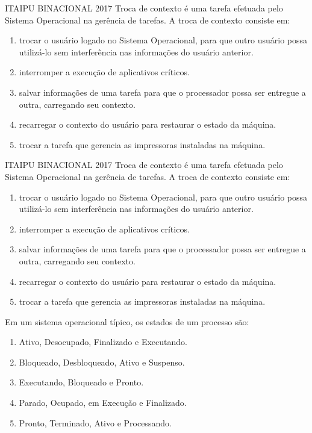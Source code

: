 \documentclass[aspectratio=169,
				xcolor=table]{beamer}
\begin{document}
	\begin{frame}{ITAIPU BINACIONAL 2017}
		Troca de contexto é uma tarefa efetuada pelo Sistema Operacional na gerência de tarefas. A troca de contexto consiste em:
		\begin{enumerate}[a]
			\item trocar o usuário logado no Sistema Operacional, para que outro usuário possa utilizá-lo sem interferência nas informações do usuário anterior.
			\item interromper a execução de aplicativos críticos.
			\item salvar informações de uma tarefa para que o processador possa ser entregue a outra, carregando seu contexto.
			\item recarregar o contexto do usuário para restaurar o estado da máquina.
			\item trocar a tarefa que gerencia as impressoras instaladas na máquina. 			
		\end{enumerate}
	\end{frame}

	\begin{frame}{ITAIPU BINACIONAL 2017}
		Troca de contexto é uma tarefa efetuada pelo Sistema Operacional na gerência de tarefas. A troca de contexto consiste em:
		\begin{enumerate}[a]
			\item trocar o usuário logado no Sistema Operacional, para que outro usuário possa utilizá-lo sem interferência nas informações do usuário anterior.
			\item interromper a execução de aplicativos críticos.
			\item \alert{salvar informações de uma tarefa para que o processador possa ser entregue a outra, carregando seu contexto.}
			\item recarregar o contexto do usuário para restaurar o estado da máquina.
			\item trocar a tarefa que gerencia as impressoras instaladas na máquina. 			
		\end{enumerate}
	\end{frame}

	\begin{frame}{}
	Em um sistema operacional típico, os estados de um processo são:
		\begin{enumerate}[a]
			\item Ativo, Desocupado, Finalizado e Executando.
			\item Bloqueado, Desbloqueado, Ativo e Suspenso.
			\item Executando, Bloqueado e Pronto.
			\item Parado, Ocupado, em Execução e Finalizado.
			\item Pronto, Terminado, Ativo e Processando.
			
		\end{enumerate}
	\end{frame}
\end{document}
